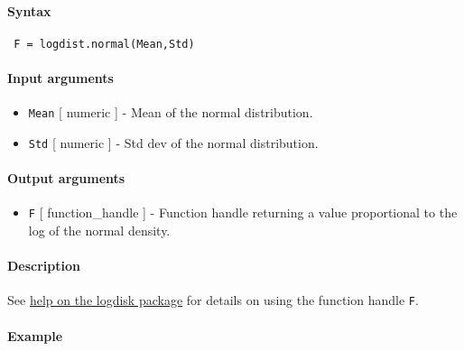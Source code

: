


	\paragraph{Syntax}
 
 \begin{verbatim}
 F = logdist.normal(Mean,Std)
 \end{verbatim}
 
 \paragraph{Input arguments}
 
 \begin{itemize}
 \item
   \texttt{Mean} {[} numeric {]} - Mean of the normal distribution.
 \item
   \texttt{Std} {[} numeric {]} - Std dev of the normal distribution.
 \end{itemize}
 
 \paragraph{Output arguments}
 
 \begin{itemize}
 \item
   \texttt{F} {[} function\_handle {]} - Function handle returning a
   value proportional to the log of the normal density.
 \end{itemize}
 
 \paragraph{Description}
 
 See \href{logdist/Contents}{help on the logdisk package} for details on
 using the function handle \texttt{F}.
 
 \paragraph{Example}


